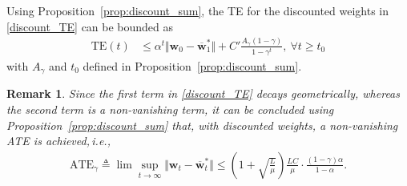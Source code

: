 \documentclass[conference]{IEEEtran}
\newcommand{\nm}[1]{\textcolor{magenta}{\bf [NM: #1]}}
\newtheorem{cor}{Corollary}
\newtheorem{remark}{Remark}
\begin{document}
Using Proposition~\ref{prop:discount_sum}, the TE for the discounted weights in \eqref{discount_TE} can be bounded as
\begin{align}
    \text{TE}(t)&\leq \alpha^{t}\Vert \mathbf{w}_{0} - \overline{\mathbf{w}}^*_{1}\Vert + C' \frac{A_\gamma(1-\gamma)}{1-\gamma^t}, \ \forall t\geq t_0 \label{discount_TE_final}
\end{align}
with $A_\gamma$ and $t_0$ defined in Proposition~\ref{prop:discount_sum}.
\begin{remark}
\label{remark:ATE_discount}Since the first term in \eqref{discount_TE} decays geometrically, whereas the second term is a non-vanishing term, it can be concluded using Proposition~\ref{prop:discount_sum} that, with discounted weights, a non-vanishing ATE is achieved,\,i.e., 
\begin{align}
    \text{ATE}_\gamma \triangleq \lim\sup_{t \to \infty} \Vert \mathbf{w}_t - \overline{\mathbf{w}}^*_t  \Vert \leq   \left(1{+} \sqrt{\frac{L}{\mu}}\right) \frac{L C}{\mu}\cdot \frac{(1-\gamma)\alpha}{1-\alpha }.
\end{align}
    \end{remark}
\end{document}
